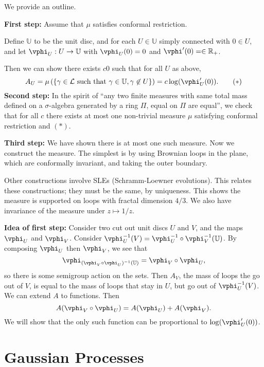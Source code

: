 \documentclass[12pt]{article}
\begin{document}
\begin{proofbox}
	We provide an outline.

	\textbf{First step:} Assume that $\mu$ satisfies conformal restriction.

	Define $\mathbb{U}$ to be the unit disc, and for each $U \in \mathbb{U}$ simply connected with $0 \in U$, and let $\vphi_U : U \to \mathbb{U}$ with $\vphi_U(0) = 0$ and $\vphi'(0) = \in \mathbb{R}_+$.

	Then we can show there exists $c  0$ such that for all $U$ as above,
	\[
		A_U = \mu \left( \{ \gamma \in \mathcal{L} \text{ such that } \gamma \in \mathbb{U}, \gamma \not \in U \} \right) = c \log (\vphi_U'(0)). \tag{$\ast$}
	\]
	\textbf{Second step:} In the spirit of ``any two finite measures with same total mass defined on a $\sigma$-algebra generated by a ring $\Pi$, equal on $\Pi$ are equal'', we check that for all $c$ there exists at most one non-trivial measure $\mu$ satisfying conformal restriction and $(\ast)$.

	\textbf{Third step:} We have shown there is at most one such measure. Now we construct the measure. The simplest is by using Brownian loops in the plane, which are conformally invariant, and taking the outer boundary.

	Other constructions involve SLEs (Schramm-Loewner evolutions). This relates these constructions; they must be the same, by uniqueness. This shows the measure is supported on loops with fractal dimension $4/3$. We also have invariance of the measure under $z \mapsto 1/z$.

	\textbf{Idea of first step:} Consider two cut out unit discs $U$ and $V$, and the maps $\vphi_U$ and $\vphi_V$. Consider $\vphi^{-1}_U(V) = \vphi^{-1}_U \circ \vphi^{-1}_V (\mathbb{U})$. By composing $\vphi_U$ then $\vphi_V$, we see that
	\[
	\vphi_{(\vphi_V \circ \vphi_U)^{-1}(\mathbb{U})} = \vphi_V \circ \vphi_U,
	\]
	so there is some semigroup action on the sets. Then $A_V$, the mass of loops the go out of $V$, is equal to the mass of loops that stay in $U$, but go out of $\vphi_U^{-1}(V)$. We can extend $A$ to functions. Then
	\[
	A(\vphi_V \circ \vphi_U) = A(\vphi_U) + A(\vphi_V).
	\]
	We will show that the only such function can be proportional to $\log(\vphi_U'(0))$.
\end{proofbox}



\newpage

\section{Gaussian Processes}%
\label{sec:gp}
\end{document}
